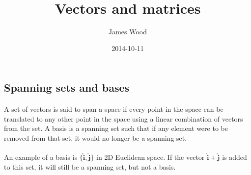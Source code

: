 \message{ !name(vm.tex)}\documentclass[11pt]{article}
\title{\textbf{Vectors and matrices}}
\author{James Wood}
\date{2014-10-11}
\newcommand*\prg{\paragraph}
\begin{document}


\subsection{Spanning sets and bases}
\prg{}A set of vectors is said to span a space if every point in the space can be translated to any other point in the space using a linear combination of vectors from the set. A basis is a spanning set such that if any element were to be removed from that set, it would no longer be a spanning set.

\prg{}An example of a basis is $\{\mathbf{\hat i},\mathbf{\hat j}\}$ in 2D Euclidean space. If the vector $\mathbf{\hat i}+\mathbf{\hat j}$ is added to this set, it will still be a spanning set, but not a basis.
\end{document}
